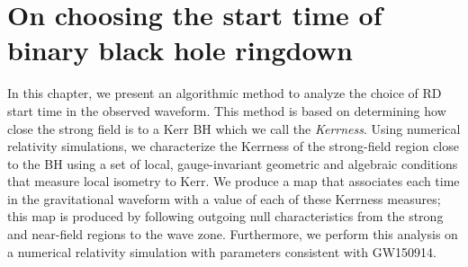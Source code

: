 


\section{On choosing the start time of binary black hole ringdown}
In this chapter, we present an algorithmic method to analyze the choice of RD start time in
the observed waveform. This method is based on determining how close the strong
field is to a Kerr BH which we call the \textit{Kerrness}. Using numerical relativity
simulations, we characterize the Kerrness of the strong-field region close to
the BH using a set of local, gauge-invariant geometric and algebraic
conditions that measure local isometry to Kerr. We produce a map that
associates each time in the gravitational waveform with a value of each of
these Kerrness measures; this map is produced by following outgoing null
characteristics from the strong and near-field regions to the wave zone. Furthermore, we
perform this analysis on a numerical relativity simulation with parameters
consistent with GW150914. 

